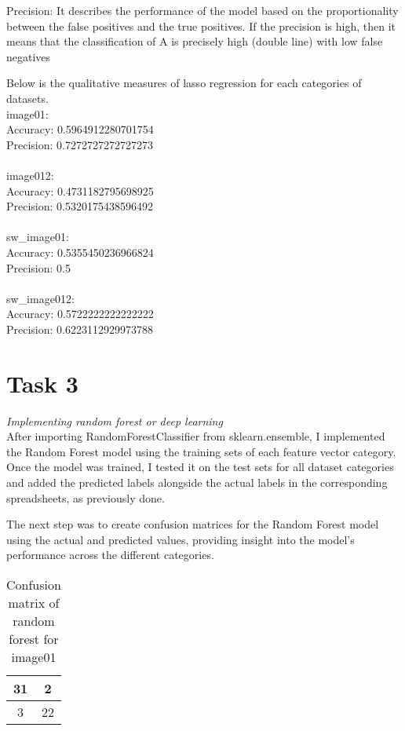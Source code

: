\documentclass[conference,12pt]{IEEEtran}
\begin{document}
Precision: It describes the performance of the model based on the proportionality between the false positives and the true positives. If the precision is high, then it means that the classification of A is precisely high (double line) with low false negatives

Below is the qualitative measures of lasso regression for each categories of datasets.
\\
image01:\\
Accuracy: 0.5964912280701754\\
Precision: 0.7272727272727273\\
\\
image012:\\
Accuracy: 0.4731182795698925\\
Precision: 0.5320175438596492\\
\\
sw\_image01:\\
Accuracy: 0.5355450236966824\\
Precision: 0.5\\
\\
sw\_image012:\\
Accuracy: 0.5722222222222222\\
Precision: 0.6223112929973788\\

\section{Task 3}
\textit{Implementing random forest or deep learning}\\
After importing RandomForestClassifier from sklearn.ensemble, I implemented the Random Forest model using the training sets of each feature vector category. Once the model was trained, I tested it on the test sets for all dataset categories and added the predicted labels alongside the actual labels in the corresponding spreadsheets, as previously done.

The next step was to create confusion matrices for the Random Forest model using the actual and predicted values, providing insight into the model's performance across the different categories.

\begin{table}[h!]
\centering
\caption{Confusion matrix of random forest for image01}
\begin{tabular}{|c|c|}
\hline
31 & 2 \\ \hline
3  & 22 \\ \hline
\end{tabular}
\end{table}
\end{document}
